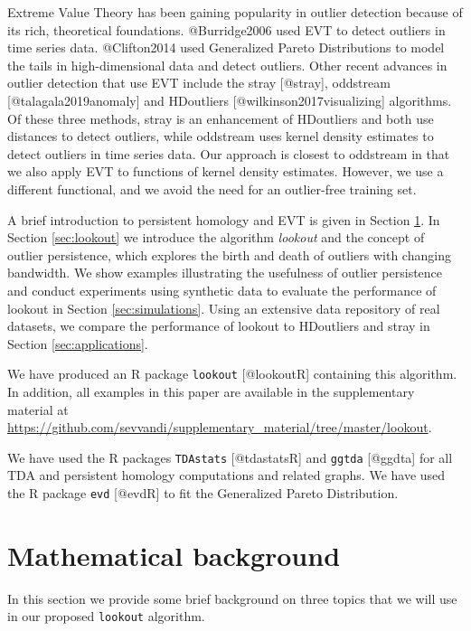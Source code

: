 \documentclass[
]{article}
\begin{document}
Extreme Value Theory has been gaining popularity in outlier detection
because of its rich, theoretical foundations. @Burridge2006 used EVT to
detect outliers in time series data. @Clifton2014 used Generalized
Pareto Distributions to model the tails in high-dimensional data and
detect outliers. Other recent advances in outlier detection that use EVT
include the stray {[}@stray{]}, oddstream {[}@talagala2019anomaly{]} and
HDoutliers {[}@wilkinson2017visualizing{]} algorithms. Of these three
methods, stray is an enhancement of HDoutliers and both use distances to
detect outliers, while oddstream uses kernel density estimates to detect
outliers in time series data. Our approach is closest to oddstream in
that we also apply EVT to functions of kernel density estimates.
However, we use a different functional, and we avoid the need for an
outlier-free training set.

A brief introduction to persistent homology and EVT is given in Section
\ref{sec:methodology}. In Section \ref{sec:lookout} we introduce the
algorithm \emph{lookout} and the concept of outlier persistence, which
explores the birth and death of outliers with changing bandwidth. We
show examples illustrating the usefulness of outlier persistence and
conduct experiments using synthetic data to evaluate the performance of
lookout in Section \ref{sec:simulations}. Using an extensive data
repository of real datasets, we compare the performance of lookout to
HDoutliers and stray in Section \ref{sec:applications}.

We have produced an R package \texttt{lookout} {[}@lookoutR{]}
containing this algorithm. In addition, all examples in this paper are
available in the supplementary material at
\url{https://github.com/sevvandi/supplementary_material/tree/master/lookout}.

We have used the R packages \texttt{TDAstats} {[}@tdastatsR{]} and
\texttt{ggtda} {[}@ggdta{]} for all TDA and persistent homology
computations and related graphs. We have used the R package \texttt{evd}
{[}@evdR{]} to fit the Generalized Pareto Distribution.

\hypertarget{sec:methodology}{%
\section{Mathematical background}\label{sec:methodology}}

In this section we provide some brief background on three topics that we
will use in our proposed \texttt{lookout} algorithm.
\end{document}
